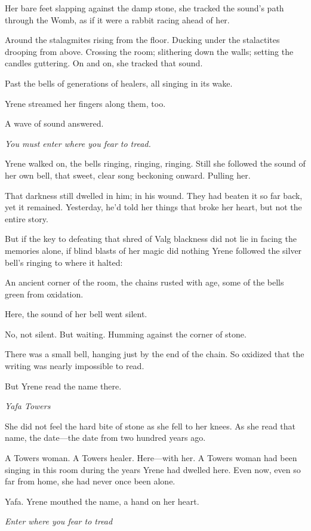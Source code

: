 Her bare feet slapping against the damp stone, she tracked the sound's path through the Womb, as if it were a rabbit racing ahead of her.

Around the stalagmites rising from the floor.
Ducking under the stalactites drooping from above.
Crossing the room; slithering down the walls; setting the candles guttering.
On and on, she tracked that sound.

Past the bells of generations of healers, all singing in its wake.

Yrene streamed her fingers along them, too.

A wave of sound answered.

\emph{You must enter where you fear to tread.}

Yrene walked on, the bells ringing, ringing, ringing.
Still she followed the sound of her own bell, that sweet, clear song beckoning onward.
Pulling her.

That darkness still dwelled in him; in his wound.
They had beaten it so far back, yet it remained.
Yesterday, he'd told her things that broke her heart, but not the entire story.

But if the key to defeating that shred of Valg blackness did not lie in facing the memories alone, if blind blasts of her magic did nothing  Yrene followed the silver bell's ringing to where it halted:

An ancient corner of the room, the chains rusted with age, some of the bells green from oxidation.

Here, the sound of her bell went silent.

No, not silent.
But waiting.
Humming against the corner of stone.

There was a small bell, hanging just by the end of the chain.
So oxidized that the writing was nearly impossible to read.

But Yrene read the name there.

\emph{Yafa Towers}

She did not feel the hard bite of stone as she fell to her knees.
As she read that name, the date---the date from two hundred years ago.

A Towers woman.
A Towers healer.
Here---with her.
A Towers woman had been singing in this room during the years Yrene had dwelled here.
Even now, even so far from home, she had never once been alone.

Yafa.
Yrene mouthed the name, a hand on her heart.

\emph{Enter where you fear to tread }

